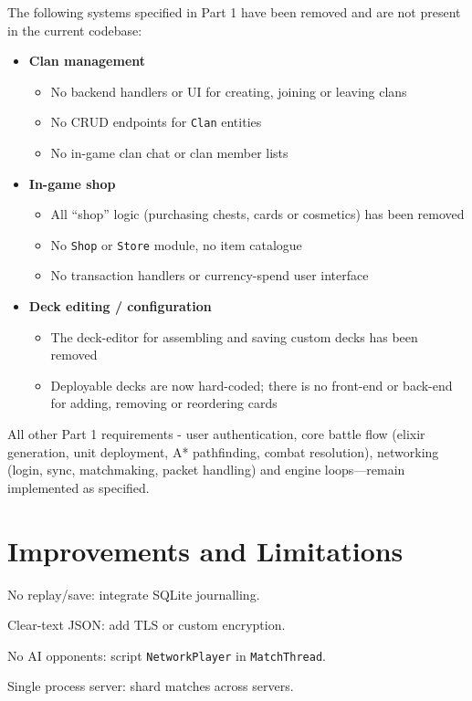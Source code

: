 \documentclass[11pt,a4paper]{article}
\begin{document}
The following systems specified in Part 1 have been removed and are not present in the current codebase:

\begin{itemize}[nosep]
  \item \textbf{Clan management}
    \begin{itemize}[nosep]
      \item No backend handlers or UI for creating, joining or leaving clans
      \item No CRUD endpoints for \texttt{Clan} entities
      \item No in-game clan chat or clan member lists
    \end{itemize}

  \item \textbf{In-game shop}
    \begin{itemize}[nosep]
      \item All “shop” logic (purchasing chests, cards or cosmetics) has been removed
      \item No \texttt{Shop} or \texttt{Store} module, no item catalogue
      \item No transaction handlers or currency-spend user interface
    \end{itemize}

  \item \textbf{Deck editing / configuration}
    \begin{itemize}[nosep]
      \item The deck-editor for assembling and saving custom decks has been removed
      \item Deployable decks are now hard-coded; there is no front-end or back-end for adding, removing or reordering cards
    \end{itemize}
\end{itemize}

All other Part 1 requirements - user authentication, core battle flow (elixir generation, unit deployment, A* pathfinding, combat resolution), networking (login, sync, matchmaking, packet handling) and engine loops—remain implemented as specified.  

\section{Improvements and Limitations}
\begin{description}[nosep]
  \item[Persistence] No replay/save: integrate SQLite journalling.
  \item[Security] Clear-text JSON: add TLS or custom encryption.
  \item[Bots] No AI opponents: script \texttt{NetworkPlayer} in \texttt{MatchThread}.
  \item[Scalability] Single process server: shard matches across servers.
\end{description}
\end{document}
